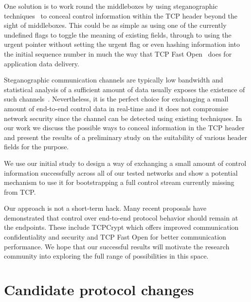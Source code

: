 \documentclass{sig-alternate-10pt}
\begin{document}
One solution is to work round the middleboxes by using steganographic techniques~\cite{Frczek:2012dl,Zielinska:2014fn,Rowland:1997vq,Murdoch:2005fz} to conceal control information within the TCP header beyond the sight of middleboxes. This could be as simple as using one of the currently undefined flags to toggle the meaning of existing fields, through to using the urgent pointer without setting the urgent flag or even hashing information into the initial sequence number in much the way that TCP Fast Open~\cite{Chu:2011tn} does for application data delivery.

Steganographic communication channels are typically low bandwidth and statistical analysis of a sufficient amount of data usually exposes the existence of such channels~\cite{Murdoch:2005fz}. Nevertheless, it is the perfect choice for exchanging a small amount of end-to-end control data in real-time and it does not compromise network security since the channel can be detected using existing techniques. In our work we discuss the possible ways to conceal information in the TCP header and present the results of a preliminary study on the suitability of various header fields for the purpose.

We use our initial study to design a way of exchanging a small amount of control information successfully across all of our tested networks and show a potential mechanism to use it for bootstrapping a full control stream currently missing from TCP.

Our approach is not a short-term hack. Many recent proposals have demonstrated that control over end-to-end protocol behavior should remain at the endpoints. These include TCPCrypt which offers improved communication confidentiality and security and TCP Fast Open for better communication performance. We hope that our successful results will motivate the research community into exploring the full range of possibilities in this space.

\section{Candidate protocol changes}
\label{sec:protocolChanges}
\end{document}
